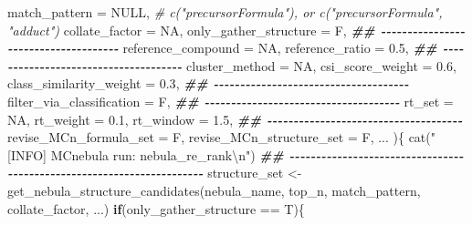 \documentclass[
]{article}
\newenvironment{Shaded}{\begin{snugshade}}{\end{snugshade}}
\newcommand{\AttributeTok}[1]{\textcolor[rgb]{0.77,0.63,0.00}{#1}}
\newcommand{\CommentTok}[1]{\textcolor[rgb]{0.56,0.35,0.01}{\textit{#1}}}
\newcommand{\ConstantTok}[1]{\textcolor[rgb]{0.00,0.00,0.00}{#1}}
\newcommand{\ControlFlowTok}[1]{\textcolor[rgb]{0.13,0.29,0.53}{\textbf{#1}}}
\newcommand{\DocumentationTok}[1]{\textcolor[rgb]{0.56,0.35,0.01}{\textbf{\textit{#1}}}}
\newcommand{\FloatTok}[1]{\textcolor[rgb]{0.00,0.00,0.81}{#1}}
\newcommand{\FunctionTok}[1]{\textcolor[rgb]{0.00,0.00,0.00}{#1}}
\newcommand{\NormalTok}[1]{#1}
\newcommand{\OtherTok}[1]{\textcolor[rgb]{0.56,0.35,0.01}{#1}}
\newcommand{\SpecialCharTok}[1]{\textcolor[rgb]{0.00,0.00,0.00}{#1}}
\newcommand{\StringTok}[1]{\textcolor[rgb]{0.31,0.60,0.02}{#1}}
\begin{document}
\begin{Shaded}
\begin{Highlighting}[]
           \AttributeTok{match\_pattern =} \ConstantTok{NULL}\NormalTok{, }\CommentTok{\# c("precursorFormula"), or c("precursorFormula", "adduct")}
           \AttributeTok{collate\_factor =} \ConstantTok{NA}\NormalTok{,}
           \AttributeTok{only\_gather\_structure =}\NormalTok{ F,}
           \DocumentationTok{\#\# {-}{-}{-}{-}{-}{-}{-}{-}{-}{-}{-}{-}{-}{-}{-}{-}{-}{-}{-}{-}{-}{-}{-}{-}{-}{-}{-}{-}{-}{-}{-}{-}{-}{-}{-}{-}{-} }
           \AttributeTok{reference\_compound =} \ConstantTok{NA}\NormalTok{,}
           \AttributeTok{reference\_ratio =} \FloatTok{0.5}\NormalTok{,}
           \DocumentationTok{\#\# {-}{-}{-}{-}{-}{-}{-}{-}{-}{-}{-}{-}{-}{-}{-}{-}{-}{-}{-}{-}{-}{-}{-}{-}{-}{-}{-}{-}{-}{-}{-}{-}{-}{-}{-}{-}{-} }
           \AttributeTok{cluster\_method =} \ConstantTok{NA}\NormalTok{,}
           \AttributeTok{csi\_score\_weight =} \FloatTok{0.6}\NormalTok{,}
           \AttributeTok{class\_similarity\_weight =} \FloatTok{0.3}\NormalTok{,}
           \DocumentationTok{\#\# {-}{-}{-}{-}{-}{-}{-}{-}{-}{-}{-}{-}{-}{-}{-}{-}{-}{-}{-}{-}{-}{-}{-}{-}{-}{-}{-}{-}{-}{-}{-}{-}{-}{-}{-}{-}{-} }
           \AttributeTok{filter\_via\_classification =}\NormalTok{ F,}
           \DocumentationTok{\#\# {-}{-}{-}{-}{-}{-}{-}{-}{-}{-}{-}{-}{-}{-}{-}{-}{-}{-}{-}{-}{-}{-}{-}{-}{-}{-}{-}{-}{-}{-}{-}{-}{-}{-}{-}{-}{-} }
           \AttributeTok{rt\_set =} \ConstantTok{NA}\NormalTok{,}
           \AttributeTok{rt\_weight =} \FloatTok{0.1}\NormalTok{,}
           \AttributeTok{rt\_window =} \FloatTok{1.5}\NormalTok{,}
           \DocumentationTok{\#\# {-}{-}{-}{-}{-}{-}{-}{-}{-}{-}{-}{-}{-}{-}{-}{-}{-}{-}{-}{-}{-}{-}{-}{-}{-}{-}{-}{-}{-}{-}{-}{-}{-}{-}{-}{-}{-} }
           \AttributeTok{revise\_MCn\_formula\_set =}\NormalTok{ F,}
           \AttributeTok{revise\_MCn\_structure\_set =}\NormalTok{ F,}
\NormalTok{           ...}
\NormalTok{           )\{}
    \FunctionTok{cat}\NormalTok{(}\StringTok{"[INFO] MCnebula run: nebula\_re\_rank}\SpecialCharTok{\textbackslash{}n}\StringTok{"}\NormalTok{)}
    \DocumentationTok{\#\# {-}{-}{-}{-}{-}{-}{-}{-}{-}{-}{-}{-}{-}{-}{-}{-}{-}{-}{-}{-}{-}{-}{-}{-}{-}{-}{-}{-}{-}{-}{-}{-}{-}{-}{-}{-}{-}{-}{-}{-}{-}{-}{-}{-}{-}{-}{-}{-}{-}{-}{-}{-}{-}{-}{-}{-}{-}{-}{-}{-}{-}{-}{-}{-}{-}{-}{-}{-}{-}{-} }
\NormalTok{    structure\_set }\OtherTok{\textless{}{-}} \FunctionTok{get\_nebula\_structure\_candidates}\NormalTok{(nebula\_name, top\_n, match\_pattern, collate\_factor,}
\NormalTok{                                                     ...)}
    \ControlFlowTok{if}\NormalTok{(only\_gather\_structure }\SpecialCharTok{==}\NormalTok{ T)\{}

\end{Highlighting}
\end{Shaded}
\end{document}
